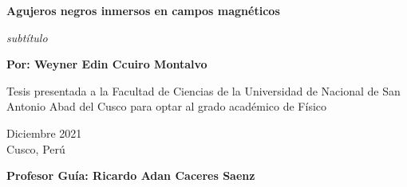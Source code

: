 
\begin{titlepage}
	
	
	\thispagestyle{frontpage}
	
	\begin{center}
		
		\vspace*{4\baselineskip}
	
		
		{\Huge \textbf{Agujeros negros inmersos en campos magnéticos\\}}%
		        \vspace*{1.5\baselineskip}

		\large{\textit{subtítulo}}\\ %
		
        \vspace*{1,5\baselineskip}

		\large{\textbf{Por: Weyner Edin Ccuiro Montalvo}}\\ %
		
		\vspace{1,5\baselineskip}
		
		\large{Tesis presentada a la Facultad de Ciencias de la Universidad de Nacional de San Antonio Abad del Cusco para optar al grado académico de Físico} %
		
		\vspace{1,5\baselineskip}
		Diciembre 2021\\ %
		Cusco, Perú %
\vspace{1,5\baselineskip}

		\large{\textbf{Profesor Guía: Ricardo Adan Caceres Saenz}}\\ %

	\end{center}
	
	\vspace*{4\baselineskip}
	
	
\end{titlepage}